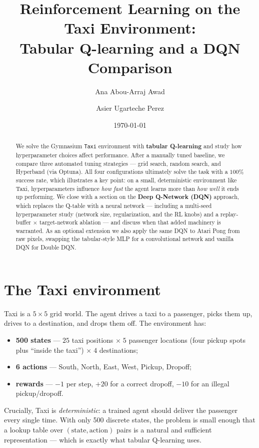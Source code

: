 \documentclass[11pt]{article}
\title{Reinforcement Learning on the Taxi Environment:\\
       Tabular Q-learning and a DQN Comparison}
\author{Ana Abou-Arraj Awad \and Asier Ugarteche Perez}
\date{\today}
\begin{document}
\maketitle

\begin{abstract}
We solve the Gymnasium \texttt{Taxi} environment with \textbf{tabular Q-learning} and
study how hyperparameter choices affect performance. After a manually tuned baseline, we
compare three automated tuning strategies --- grid search, random search, and Hyperband
(via Optuna). All four configurations ultimately solve the task with a $100\%$ success
rate, which illustrates a key point: on a small, deterministic environment like Taxi,
hyperparameters influence \emph{how fast} the agent learns more than \emph{how well} it
ends up performing. We close with a section on the \textbf{Deep Q-Network (DQN)} approach,
which replaces the Q-table with a neural network --- including a multi-seed hyperparameter
study (network size, regularization, and the RL knobs) and a replay-buffer $\times$
target-network ablation --- and discuss when that added machinery is warranted. As an optional
extension we also apply the same DQN to Atari Pong from raw pixels, swapping the tabular-style MLP
for a convolutional network and vanilla DQN for Double DQN.
\end{abstract}

\section{The Taxi environment}
Taxi is a $5\times5$ grid world. The agent drives a taxi to a passenger, picks them up,
drives to a destination, and drops them off. The environment has:
\begin{itemize}[noitemsep]
  \item \textbf{500 states} --- $25$ taxi positions $\times\;5$ passenger locations
        (four pickup spots plus ``inside the taxi'') $\times\;4$ destinations;
  \item \textbf{6 actions} --- South, North, East, West, Pickup, Dropoff;
  \item \textbf{rewards} --- $-1$ per step, $+20$ for a correct dropoff, $-10$ for an
        illegal pickup/dropoff.
\end{itemize}
Crucially, Taxi is \emph{deterministic}: a trained agent should deliver the passenger every
single time. With only 500 discrete states, the problem is small enough that a lookup
table over $(\text{state}, \text{action})$ pairs is a natural and sufficient representation
--- which is exactly what tabular Q-learning uses.
\end{document}
